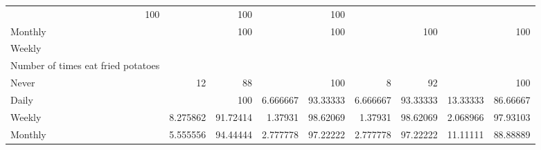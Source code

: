 \documentclass{article}
\begin{document}
\begin{tabular}{lllllllll}
  \multicolumn{1}{r}{100} &
  \multicolumn{1}{r}{} &
  \multicolumn{1}{r}{100} &
  \multicolumn{1}{r}{} &
  \multicolumn{1}{r}{100} \\
\multicolumn{1}{l}{\hspace{5em}Monthly} &
  \multicolumn{1}{|r}{} &
  \multicolumn{1}{r}{100} &
  \multicolumn{1}{r}{} &
  \multicolumn{1}{r}{100} &
  \multicolumn{1}{r}{} &
  \multicolumn{1}{r}{100} &
  \multicolumn{1}{r}{} &
  \multicolumn{1}{r}{100} \\
\multicolumn{1}{l}{\hspace{3em}Weekly} &
  \multicolumn{1}{|r}{} &
  \multicolumn{1}{r}{} &
  \multicolumn{1}{r}{} &
  \multicolumn{1}{r}{} &
  \multicolumn{1}{r}{} &
  \multicolumn{1}{r}{} &
  \multicolumn{1}{r}{} &
  \multicolumn{1}{r}{} \\
\multicolumn{1}{l}{\hspace{4em}Number of times eat fried potatoes} &
  \multicolumn{1}{|r}{} &
  \multicolumn{1}{r}{} &
  \multicolumn{1}{r}{} &
  \multicolumn{1}{r}{} &
  \multicolumn{1}{r}{} &
  \multicolumn{1}{r}{} &
  \multicolumn{1}{r}{} &
  \multicolumn{1}{r}{} \\
\multicolumn{1}{l}{\hspace{5em}Never} &
  \multicolumn{1}{|r}{12} &
  \multicolumn{1}{r}{88} &
  \multicolumn{1}{r}{} &
  \multicolumn{1}{r}{100} &
  \multicolumn{1}{r}{8} &
  \multicolumn{1}{r}{92} &
  \multicolumn{1}{r}{} &
  \multicolumn{1}{r}{100} \\
\multicolumn{1}{l}{\hspace{5em}Daily} &
  \multicolumn{1}{|r}{} &
  \multicolumn{1}{r}{100} &
  \multicolumn{1}{r}{6.666667} &
  \multicolumn{1}{r}{93.33333} &
  \multicolumn{1}{r}{6.666667} &
  \multicolumn{1}{r}{93.33333} &
  \multicolumn{1}{r}{13.33333} &
  \multicolumn{1}{r}{86.66667} \\
\multicolumn{1}{l}{\hspace{5em}Weekly} &
  \multicolumn{1}{|r}{8.275862} &
  \multicolumn{1}{r}{91.72414} &
  \multicolumn{1}{r}{1.37931} &
  \multicolumn{1}{r}{98.62069} &
  \multicolumn{1}{r}{1.37931} &
  \multicolumn{1}{r}{98.62069} &
  \multicolumn{1}{r}{2.068966} &
  \multicolumn{1}{r}{97.93103} \\
\multicolumn{1}{l}{\hspace{5em}Monthly} &
  \multicolumn{1}{|r}{5.555556} &
  \multicolumn{1}{r}{94.44444} &
  \multicolumn{1}{r}{2.777778} &
  \multicolumn{1}{r}{97.22222} &
  \multicolumn{1}{r}{2.777778} &
  \multicolumn{1}{r}{97.22222} &
  \multicolumn{1}{r}{11.11111} &
  \multicolumn{1}{r}{88.88889} \\

\end{tabular}
\end{document}
